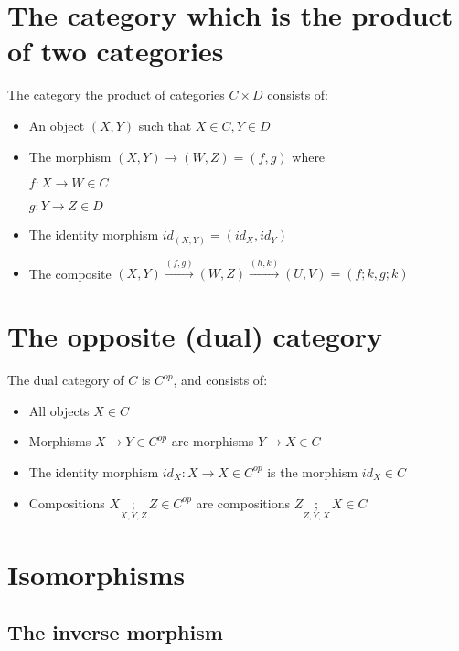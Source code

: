 \documentclass[../main.tex]{subfiles}
\begin{document}
\section{The category which is the product of two categories}

The category the product of categories $C \times D$ consists of:
\begin{itemize}
  \item An object $(X,Y)$ such that $X \in C , Y \in D$
  \item The morphism $(X,Y) \rightarrow (W,Z) = (f,g)$ where \par
        $f : X \rightarrow W \in C$ \par
        $g : Y \rightarrow Z \in D$
  \item The identity morphism $id_{(X,Y)} = (id_X , id_Y )$
  \item The composite $(X,Y) \xrightarrow{(f,g)} (W,Z) \xrightarrow{(h,k)} (U,V) = (f ; k , g ; k)$
\end{itemize}

\section{The opposite (dual) category}

The dual category of $C$ is $C^{op}$, and consists of:
\begin{itemize}
  \item All objects $X \in C$
  \item Morphisms $X \rightarrow Y \in C^{op}$ are morphisms
        $Y \rightarrow X \in C$
  \item The identity morphism $id_{X} : X \rightarrow X \in C^{op}$ is the morphism $id_{X} \in C$
  \item Compositions $X \underset{X,Y,Z}{;} Z \in C^{op}$ are compositions $Z \underset{Z,Y,X}{;} X \in C$
\end{itemize}

\section{Isomorphisms}

\subsection{The inverse morphism}
\end{document}
